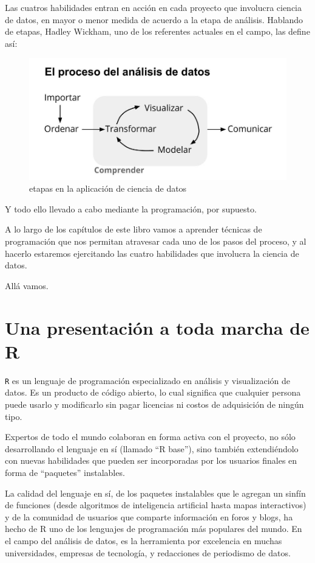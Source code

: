 \documentclass[spanish,]{book}
\begin{document}
Las cuatros habilidades entran en acción en cada proyecto que involucra ciencia de datos, en mayor o menor medida de acuerdo a la etapa de análisis. Hablando de etapas, Hadley Wickham, uno de los referentes actuales en el campo, las define así:

\begin{figure}
\centering
\includegraphics{imagenes/proceso_ciencia_datos.jpg}
\caption{\label{fig:unnamed-chunk-4}etapas en la aplicación de ciencia de datos}
\end{figure}

Y todo ello llevado a cabo mediante la programación, por supuesto.

A lo largo de los capítulos de este libro vamos a aprender técnicas de programación que nos permitan atravesar cada uno de los pasos del proceso, y al hacerlo estaremos ejercitando las cuatro habilidades que involucra la ciencia de datos.

Allá vamos.

\hypertarget{una-presentacion-a-toda-marcha-de-r}{%
\chapter{Una presentación a toda marcha de R}\label{una-presentacion-a-toda-marcha-de-r}}

\texttt{R} es un lenguaje de programación especializado en análisis y visualización de datos. Es un producto de código abierto, lo cual significa que cualquier persona puede usarlo y modificarlo sin pagar licencias ni costos de adquisición de ningún tipo.

Expertos de todo el mundo colaboran en forma activa con el proyecto, no sólo desarrollando el lenguaje en sí (llamado ``R base''), sino también extendiéndolo con nuevas habilidades que pueden ser incorporadas por los usuarios finales en forma de ``paquetes'' instalables.

La calidad del lenguaje en sí, de los paquetes instalables que le agregan un sinfín de funciones (desde algoritmos de inteligencia artificial hasta mapas interactivos) y de la comunidad de usuarios que comparte información en foros y blogs, ha hecho de R uno de los lenguajes de programación más populares del mundo. En el campo del análisis de datos, es la herramienta por excelencia en muchas universidades, empresas de tecnología, y redacciones de periodismo de datos.
\end{document}
